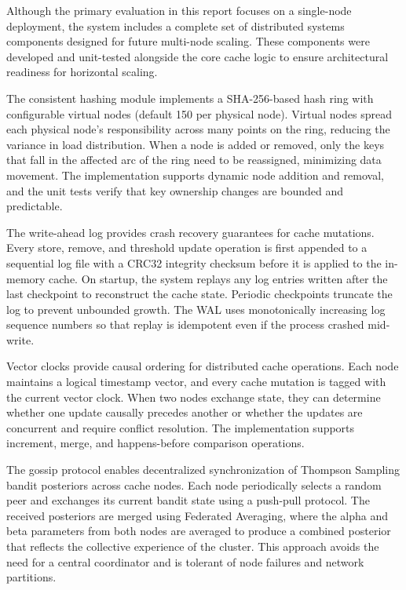 \documentclass[12pt,a4paper]{report}
\begin{document}
Although the primary evaluation in this report focuses on a single-node deployment, the system includes a complete set of distributed systems components designed for future multi-node scaling. These components were developed and unit-tested alongside the core cache logic to ensure architectural readiness for horizontal scaling.

The consistent hashing module implements a SHA-256-based hash ring with configurable virtual nodes (default 150 per physical node). Virtual nodes spread each physical node's responsibility across many points on the ring, reducing the variance in load distribution. When a node is added or removed, only the keys that fall in the affected arc of the ring need to be reassigned, minimizing data movement. The implementation supports dynamic node addition and removal, and the unit tests verify that key ownership changes are bounded and predictable.

The write-ahead log provides crash recovery guarantees for cache mutations. Every store, remove, and threshold update operation is first appended to a sequential log file with a CRC32 integrity checksum before it is applied to the in-memory cache. On startup, the system replays any log entries written after the last checkpoint to reconstruct the cache state. Periodic checkpoints truncate the log to prevent unbounded growth. The WAL uses monotonically increasing log sequence numbers so that replay is idempotent even if the process crashed mid-write.

Vector clocks provide causal ordering for distributed cache operations. Each node maintains a logical timestamp vector, and every cache mutation is tagged with the current vector clock. When two nodes exchange state, they can determine whether one update causally precedes another or whether the updates are concurrent and require conflict resolution. The implementation supports increment, merge, and happens-before comparison operations.

The gossip protocol enables decentralized synchronization of Thompson Sampling bandit posteriors across cache nodes. Each node periodically selects a random peer and exchanges its current bandit state using a push-pull protocol. The received posteriors are merged using Federated Averaging, where the alpha and beta parameters from both nodes are averaged to produce a combined posterior that reflects the collective experience of the cluster. This approach avoids the need for a central coordinator and is tolerant of node failures and network partitions.
\end{document}
